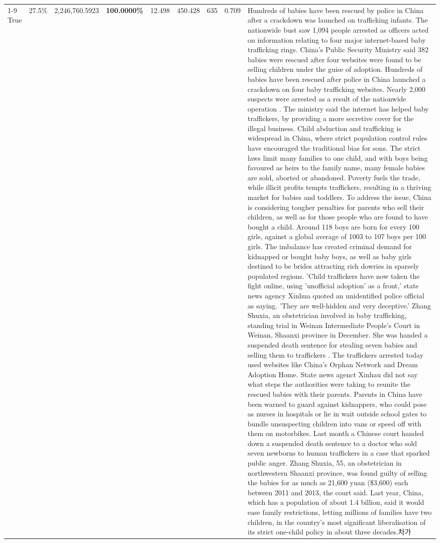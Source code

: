 \begin{table}[H]
\begin{tabular}{lllrlllll}
\cline{1-9}
True & 27.5\% & 2,246,760.5923 & \bfseries \color{red} 100.0000\% & 12.498 & 450.428 & 635 & 0.709 & Hundreds of babies have been rescued by police in China after a crackdown was launched on trafficking infants. The nationwide bust saw 1,094 people arrested as officers acted on information relating to four major internet-based baby trafficking rings. China's Public Security Ministry said 382 babies were rescued after four websites were found to be selling children under the guise of adoption. Hundreds of babies have been rescued after police in China launched a crackdown on four baby trafficking websites. Nearly 2,000 suspects were arrested as a result of the nationwide operation . The ministry said the internet has helped baby traffickers, by providing a more secretive cover for the illegal business. Child abduction and trafficking is widespread in China, where strict population control rules have encouraged the traditional bias for sons. The strict laws limit many families to one child, and with boys being favoured as heirs to the family name, many female babies are sold, aborted or abandoned. Poverty fuels the trade, while illicit profits tempts traffickers, resulting in a thriving market for babies and toddlers. To address the issue, China is considering tougher penalties for parents who sell their children, as well as for those people who are found to have bought a child. Around 118 boys are born for every 100 girls, against a global average of 1003 to 107 boys per 100 girls. The imbalance has created criminal demand for kidnapped or bought baby boys, as well as baby girls destined to be brides attracting rich dowries in sparsely populated regions. 'Child traffickers have now taken the fight online, using 'unofficial adoption' as a front,' state news agency Xinhua quoted an unidentified police official as saying. 'They are well-hidden and very deceptive.' Zhang Shuxia, an obstetrician involved in baby trafficking, standing trial in Weinan Intermediate People's Court in Weinan, Shaanxi province in December. She was handed a suspended death sentence for stealing seven babies and selling them to traffickers . The traffickers arrested today used websites like China's Orphan Network and Dream Adoption Home. State news agenct Xinhau did not say what steps the authorities were taking to reunite the rescued babies with their parents. Parents in China have been warned to guard against kidnappers, who could pose as nurses in hospitals or lie in wait outside school gates to bundle unsuspecting children into vans or speed off with them on motorbikes. Last month a Chinese court handed down a suspended death sentence to a doctor who sold seven newborns to human traffickers in a case that sparked public anger. Zhang Shuxia, 55, an obstetrician in northwestern Shaanxi province, was found guilty of selling the babies for as much as 21,600 yuan (\$3,600) each between 2011 and 2013, the court said. Last year, China, which has a population of about 1.4 billion, said it would ease family restrictions, letting millions of families have two children, in the country's most significant liberalisation of its strict one-child policy in about three decades.차가 \\

\end{tabular}
\end{table}
